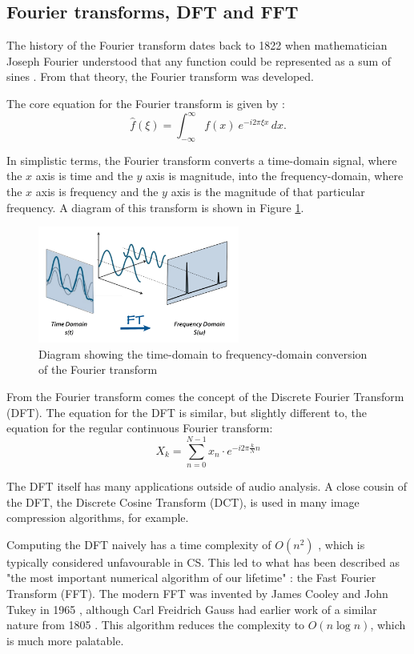 \documentclass[11pt]{article}
\begin{document}
\subsection{Fourier transforms, DFT and FFT}
The history of the Fourier transform dates back to 1822 when mathematician Joseph Fourier understood that any
function could be represented as a sum of sines \cite{wolframFourierSeries}. From that theory, the Fourier
transform was developed.

The core equation for the Fourier transform is given by \cite{wolframFourierTransform}:
$$\widehat{f}(\xi) = \int_{-\infty}^{\infty} f(x)\ e^{-i 2\pi \xi x}\,dx.$$

In simplistic terms, the Fourier transform converts a time-domain signal, where the $x$ axis is time and the
$y$ axis is magnitude, into the frequency-domain, where the $x$ axis is frequency and the $y$ axis is the
magnitude of that particular frequency. A diagram of this transform is shown in Figure \ref{fig:ftdiagram}.

\begin{figure}[H]
\centering
\includegraphics[width=250px]{img/fouriertransform.png}
\caption{Diagram showing the time-domain to frequency-domain conversion of the Fourier transform}
\label{fig:ftdiagram}
\end{figure}

From the Fourier transform comes the concept of the Discrete Fourier Transform (DFT). The equation for the DFT
is similar, but slightly different to, the equation for the regular continuous Fourier transform:
$$X_k = \sum_{n=0}^{N-1} x_n \cdot e^{-i2\pi \tfrac{k}{N}n}$$

The DFT itself has many applications outside of audio analysis. A close cousin of the DFT, the Discrete Cosine
Transform (DCT), is used in many image compression algorithms, for example.

Computing the DFT naively has a time complexity of $O(n^2)$ \cite{Rajaby2022} , which is typically considered
unfavourable in CS. This led to what has been described as "the most important numerical algorithm of our
lifetime" \cite{Strang1994}: the Fast Fourier Transform (FFT). The modern FFT was invented by James Cooley and
John Tukey in 1965 \cite{Cooley1965AnAF}, although Carl Freidrich Gauss had earlier work of a similar nature
from 1805 \cite{Heideman1985}. This algorithm reduces the complexity to $O(n \log n)$, which is much more
palatable.
\end{document}
